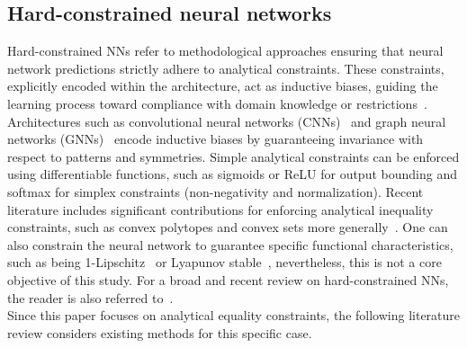 \subsection{Hard-constrained neural networks}
\label{subsec:related-work-hard}
Hard-constrained NNs refer to methodological approaches ensuring that neural network predictions strictly adhere to analytical constraints. These constraints, explicitly encoded within the architecture, act as inductive biases, guiding the learning process toward compliance with domain knowledge or restrictions~\cite{Karniadakis2021_Physicsinformedmachine}. Architectures such as convolutional neural networks (CNNs)~\cite{LeCun1989_BackpropagationAppliedHandwritten} and graph neural networks (GNNs)~\cite{Bronstein2017_GeometricDeepLearning, Wu2021_ComprehensiveSurveyGraph} encode inductive biases by guaranteeing invariance with respect to patterns and symmetries. Simple analytical constraints can be enforced using differentiable functions, such as sigmoids or ReLU for output bounding and softmax for simplex constraints (non-negativity and normalization). Recent literature includes significant contributions for enforcing analytical inequality constraints, such as convex polytopes and convex sets more generally~\cite{Frerix2020_HomogeneousLinearInequality, Donti2021_DC3learningmethod, Wang2024_LinSATNetPositiveLinear, Tordesillas2023_RAYENImpositionHard, Konstantinov2023_NewComputationallySimple}. One can also constrain the neural network to guarantee specific functional characteristics, such as being 1-Lipschitz~\cite{Anil2018_SortingoutLipschitz} or Lyapunov stable~\cite{Manek2020_LearningStableDeepa}, nevertheless, this is not a core objective of this study. For a broad and recent review on hard-constrained NNs, the reader is also referred to~\cite{Min2024_HardConstrainedNeural}.\\
Since this paper focuses on analytical equality constraints, the following literature review considers existing methods for this specific case. 

